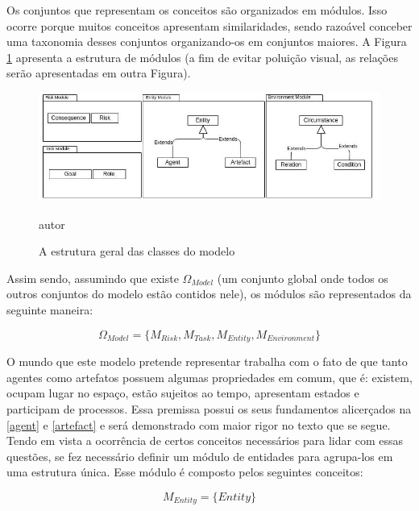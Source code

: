 Os conjuntos que representam os conceitos são organizados em  módulos. Isso ocorre porque muitos conceitos apresentam similaridades, sendo razoável conceber uma taxonomia desses conjuntos organizando-os em conjuntos maiores. A Figura \ref{module} apresenta a estrutura de módulos (a fim de evitar poluição visual, as relações serão apresentadas em outra Figura). 

\begin{figure}[H]
  \centering
  \caption{A estrutura geral das classes do modelo}
  \includegraphics[width=1\linewidth]{figure/Module.jpeg} 
  \begin{center}
  autor
  \end{center}
  \label{module}
\end{figure}

Assim sendo, assumindo que existe $\Omega_{Model}$ (um conjunto global onde todos os outros conjuntos do modelo estão contidos nele), os módulos são representados da seguinte maneira: 

\begin{equation} 
    \Omega_{Model} = \{ M_{Risk}, M_{Task}, M_{Entity}, M_{Environment}\}
\end{equation}
\label{modules}


O mundo que este modelo pretende representar trabalha com o fato de que tanto agentes como artefatos possuem algumas propriedades em comum, que é: existem, ocupam lugar no espaço, estão sujeitos ao tempo, apresentam estados e participam de processos. Essa premissa possui os seus fundamentos alicerçados na \ref{agent} e \ref{artefact} e será demonstrado com maior rigor no texto que se segue. Tendo em vista a ocorrência de certos conceitos necessários para lidar com essas questões, se fez necessário definir um módulo de entidades para agrupa-los em uma estrutura única. Esse módulo é composto pelos seguintes conceitos:

\begin{equation} 
M_{Entity} = \{ Entity \}
\end{equation}\label{modent}

